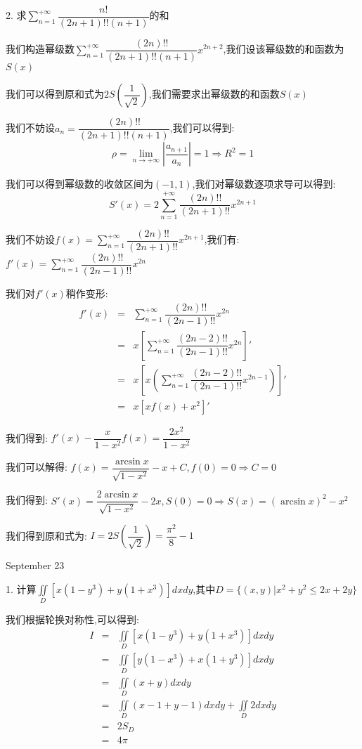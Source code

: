 2. 求$\sum\limits_{n=1}^{+\infty}\dfrac{n!}{(2n+1)!!(n+1)}$的和
\begin{solution}

	我们构造幂级数$\sum\limits_{n=1}^{+\infty}\dfrac{(2n)!!}{(2n+1)!!(n+1)}x^{2n+2}$,我们设该幂级数的和函数为$S(x)$
	
	我们可以得到原和式为$2S(\dfrac{1}{\sqrt{2}})$,我们需要求出幂级数的和函数$S(x)$
	
	我们不妨设$a_{n}=\dfrac{(2n)!!}{(2n+1)!!(n+1)}$,我们可以得到:  
	$$\rho=\lim\limits_{n\to +\infty}|\dfrac{a_{n+1}}{a_{n}}|=1\Rightarrow R^2=1$$
	
	我们可以得到幂级数的收敛区间为$(-1,1)$,我们对幂级数逐项求导可以得到:  
	$$S'(x)=2\sum\limits_{n=1}^{+\infty}\dfrac{(2n)!!}{(2n+1)!!}x^{2n+1}$$
	
	我们不妨设$f(x)=\sum\limits_{n=1}^{+\infty}\dfrac{(2n)!!}{(2n+1)!!}x^{2n+1}$,我们有:  $f'(x)=\sum\limits_{n=1}^{+\infty}\dfrac{(2n)!!}{(2n-1)!!}x^{2n}$
	
	我们对$f'(x)$稍作变形:  
	\begin{eqnarray*}
		f'(x)&=&\sum\limits_{n=1}^{+\infty}\dfrac{(2n)!!}{(2n-1)!!}x^{2n}\\
		&=&x\left[\sum\limits_{n=1}^{+\infty}\dfrac{(2n-2)!!}{(2n-1)!!}x^{2n} \right]'\\
		&=&x\left[ x\left(\sum\limits_{n=1}^{+\infty}\dfrac{(2n-2)!!}{(2n-1)!!}x^{2n-1} \right) \right]'\\
		&=&x\left[ xf(x)+x^2\right]'   
	\end{eqnarray*}

	我们得到:  $f'(x)-\dfrac{x}{1-x^2}f(x)=\dfrac{2x^2}{1-x^2}$
	
	我们可以解得:  $f(x)=\dfrac{\arcsin x}{\sqrt{1-x^2}}-x+C,f(0)=0\Rightarrow C=0$
	
	我们得到:  $S'(x)=\dfrac{2\arcsin x}{\sqrt{1-x^2}}-2x,S(0)=0\Rightarrow S(x)=(\arcsin x)^2-x^2$
	
	我们得到原和式为:  $I=2S(\dfrac{1}{\sqrt{2}})=\dfrac{\pi^2}{8}-1$
\end{solution}

\textcolor{purplea}{September 23}

1. 计算$\iint\limits_{D}\left[ x(1-y^3)+y(1+x^3)\right]dxdy$,其中$D=\{(x,y)|x^2+y^2\leq 2x+2y\}$
\begin{solution}

	我们根据轮换对称性,可以得到:
	\begin{eqnarray*}
		I&=&\iint\limits_{D}\left[ x(1-y^3)+y(1+x^3)\right]dxdy\\
		&=&\iint\limits_{D}\left[ y(1-x^3)+x(1+y^3)\right]dxdy\\
		&=&\iint\limits_{D}(x+y)dxdy\\
		&=&\iint\limits_{D}(x-1+y-1)dxdy+\iint\limits_{D}2dxdy\\
		&=&2S_{D}\\
		&=&4\pi
	\end{eqnarray*}
\end{solution}

